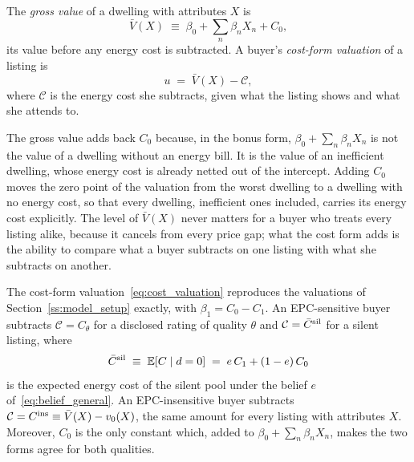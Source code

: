 \begin{definition}
\label{def:cost_form}
The \emph{gross value} of a dwelling with attributes $X$ is
\begin{equation}
    \bar V(X)\;\equiv\;\beta_0+\sum_n\beta_nX_n+C_0,
    \label{eq:gross_value}
\end{equation}
its value before any energy cost is subtracted. A buyer's \emph{cost-form valuation} of a listing is
\begin{equation}
    u\;=\;\bar V(X)-\mathcal C,
    \label{eq:cost_valuation}
\end{equation}
where $\mathcal C$ is the energy cost she subtracts, given what the listing shows and what she attends to.
\end{definition}

The gross value adds back $C_0$ because, in the bonus form, $\beta_0+\sum_n\beta_nX_n$ is not the value of a dwelling without an energy bill. It is the value of an inefficient dwelling, whose energy cost is already netted out of the intercept. Adding $C_0$ moves the zero point of the valuation from the worst dwelling to a dwelling with no energy cost, so that every dwelling, inefficient ones included, carries its energy cost explicitly. The level of $\bar V(X)$ never matters for a buyer who treats every listing alike, because it cancels from every price gap; what the cost form adds is the ability to compare what a buyer subtracts on one listing with what she subtracts on another.

\begin{lemma}
\label{lem:cost_form}
The cost-form valuation~\eqref{eq:cost_valuation} reproduces the valuations of Section~\ref{ss:model_setup} exactly, with $\beta_1=C_0-C_1$. An EPC-sensitive buyer subtracts $\mathcal C=C_\theta$ for a disclosed rating of quality $\theta$ and $\mathcal C=\bar C^{\rm sil}$ for a silent listing, where
\begin{equation}
    \bar C^{\rm sil}\;\equiv\;\mathbb E[C\mid d=0]\;=\;e\,C_1+(1-e)\,C_0
    \label{eq:csil}
\end{equation}
is the expected energy cost of the silent pool under the belief $e$ of~\eqref{eq:belief_general}. An EPC-insensitive buyer subtracts $\mathcal C=C^{\rm ins}\equiv\bar V(X)-v_0(X)$, the same amount for every listing with attributes $X$. Moreover, $C_0$ is the only constant which, added to $\beta_0+\sum_n\beta_nX_n$, makes the two forms agree for both qualities.
\end{lemma}

